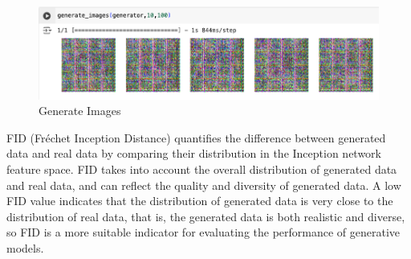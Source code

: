 \begin{figure}[H]
    \centering
    \includegraphics[width=1.2\linewidth]{./Images/generate_images.jpg}
    \caption{Generate Images}
    \label{fig:my_picture}
\end{figure}


FID (Fréchet Inception Distance) quantifies the difference between generated data and real 
data by comparing their distribution in the Inception network feature space. FID takes into 
account the overall distribution of generated data and real data, and can reflect the quality 
and diversity of generated data. A low FID value indicates that the distribution of generated 
data is very close to the distribution of real data, that is, the generated data is both realistic 
and diverse, so FID is a more suitable indicator for evaluating the performance of generative models.